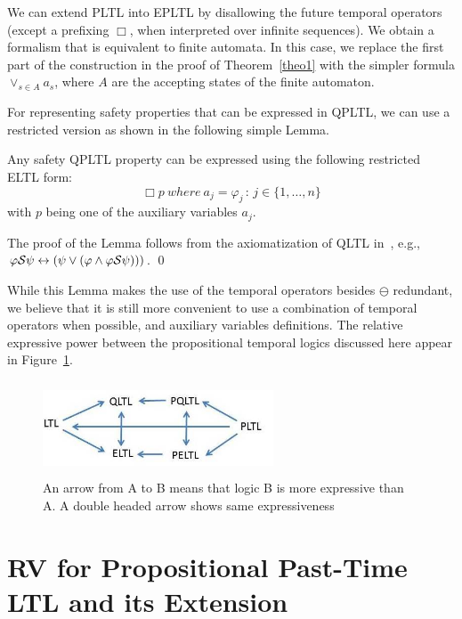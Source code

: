 We can extend PLTL into EPLTL by disallowing the future temporal operators (except a prefixing $\Box$, when interpreted over infinite sequences). We obtain
a formalism that is equivalent to finite automata. In this case, 
we replace the first part of the construction in the proof of Theorem~\ref{theo1}
with the simpler formula $\vee_{s \in A} a_s$, where $A$ are the accepting states of the finite automaton.

For representing safety properties that can be expressed in QPLTL, we can use a restricted version as shown in the following simple Lemma.
\begin{lemma}
\label{simplecase}
Any safety QPLTL property can be expressed using the following restricted
ELTL form:
\[  \Box p {\ where\ } a_j  = \varphi_j \, : \, 
 {j \in \{1, \ldots , n\}}  \] 
 with $p$ being one of the auxiliary variables $a_j$.
\end{lemma}
 The proof of the Lemma follows from the
axiomatization of QLTL in~\cite{MP}, e.g.,
$\varphi {\cal S} \psi \leftrightarrow ( \psi \vee ( \varphi \wedge \varphi {\cal S} \psi) ) )$. \qed

While this Lemma makes the use of the temporal operators
besides $\ominus$ redundant, we believe that it is still
more convenient to use a combination of
temporal operators when possible, and
auxiliary variables definitions.
The relative expressive power between the propositional temporal logics discussed here
appear in Figure~\ref{prop}.






\begin{figure}
\begin{center}
\includegraphics[height=1.1in,width=2.7in]{PROP.jpg}
\caption{\label{prop} An arrow from A to B means that logic  B is more expressive than A. A double headed arrow shows same expressiveness}
\end{center}
\end{figure}




\section{RV for Propositional Past-Time LTL and its Extension}
\label{LTLruntime}

